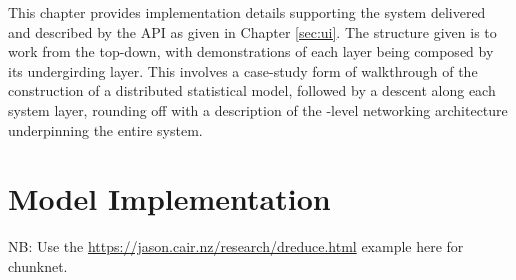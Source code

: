 This chapter provides implementation details supporting the system delivered and described by the API as given in Chapter \ref{sec:ui}.
The structure given is to work from the top-down, with demonstrations of each layer being composed by its undergirding layer.
This involves a case-study form of walkthrough of the construction of a distributed statistical model, followed by a descent along each system layer, rounding off with a description of the -level networking architecture underpinning the entire system.

\section{Model Implementation}\label{glm}

NB: Use the \url{https://jason.cair.nz/research/dreduce.html} example here for chunknet.
